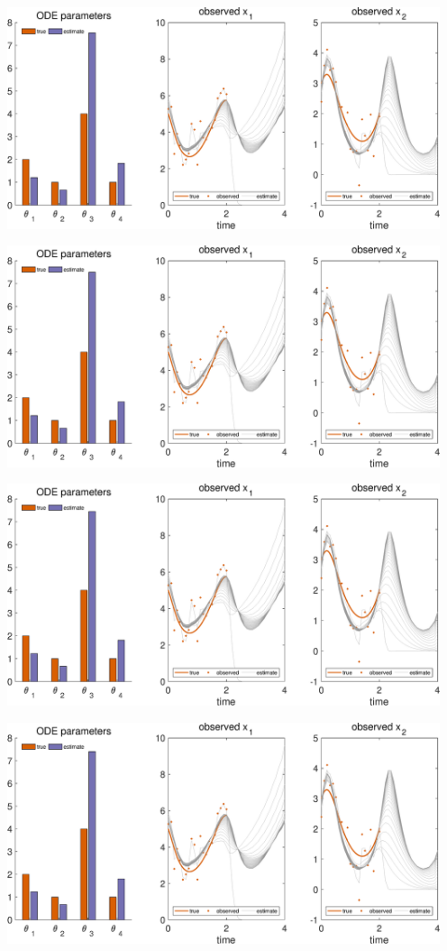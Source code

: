 {\includegraphics [width=5in]{VGM_for_Lotka_Volterra_30.eps}

\includegraphics [width=5in]{VGM_for_Lotka_Volterra_31.eps}

\includegraphics [width=5in]{VGM_for_Lotka_Volterra_32.eps}

\includegraphics [width=5in]{VGM_for_Lotka_Volterra_33.eps}

}
